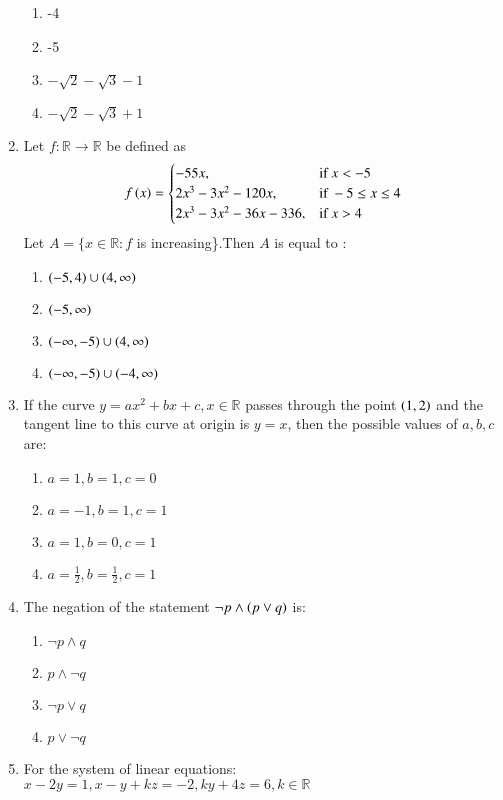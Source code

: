 \documentclass[journal,12pt,onecolumn]{IEEEtran}
\theoremstyle{remark}
\begin{document}
\begin{enumerate}
    \begin{enumerate}
        \item -4
        \item -5
        \item $-\sqrt{2}-\sqrt{3}-1$
        \item $-\sqrt{2}-\sqrt{3}+1$
    \end{enumerate}
    \item Let $f:\mathbb{R}\rightarrow\mathbb{R}$ be defined as 
    \[
    f\left(x\right)=
    \begin{cases}
        -55x,&\text{if } x<-5\\
        2x^3-3x^2-120x,&\text{if } -5\leq x\leq4\\
        2x^3-3x^2-36x-336,&\text{if } x>4
    \end{cases}
    \]
    Let $A=\{x \in \mathbb{R}:f$ is increasing\}.Then $A$ is equal to :
    \begin{enumerate}
        \item $\left(-5,4\right) \cup \left(4,\infty\right)$
        \item $\left(-5,\infty\right)$
        \item $\left(-\infty,-5\right) \cup \left(4,\infty\right)$
        \item $\left(-\infty,-5\right) \cup \left(-4,\infty\right)$
    \end{enumerate}
    \item If the curve $y = ax^2 + bx + c,x \in \mathbb{R}$ passes through the point $\left(1, 2\right)$ and the tangent line to this curve at origin is $y = x$, then the possible values of $a, b, c$ are:
    \begin{enumerate}
        \item $a = 1, b = 1, c = 0$
        \item $a = -1, b = 1, c = 1$
        \item $a = 1, b = 0, c = 1$
        \item $a = \frac{1}{2}, b = \frac{1}{2}, c = 1$
    \end{enumerate}
    \item  The negation of the statement $\neg p\land \left(p\lor q\right)$ is:
    \begin{enumerate}
        \item $\neg p\land q$
        \item $p \land \neg q$
        \item $\neg p \lor q$
        \item $p \lor \neg q$
    \end{enumerate}
    \item For the system of linear equations:$x-2y = 1, x-y + kz = -2, ky + 4z = 6,k \in \mathbb{R}$\\

\end{enumerate}
\end{document}
